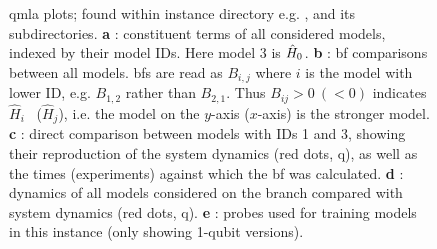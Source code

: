 \begin{figure}[H]
\begin{center}
{            \label{fig:qmla_bayes_factor_comparison}
        }
        \qquad
        \qquad
    \end{center}
    \caption[Instance plots]{
        \gls{qmla} plots; found within instance directory e.g. , 
        and its subdirectories. 
        \textbf{a} : constituent terms of all considered models, indexed by their model IDs.
        Here model 3 is $\hat{H}_0$. 
        \textbf{b} : \acrfull{bf} comparisons between all models. 
        \glspl{bf} are read as $B_{i,j}$ where $i$ is the model with lower ID, 
            e.g. $B_{1,2}$ rather than $B_{2,1}$. 
            Thus $B_{ij} > 0 \ (<0)$ indicates $\hat{H}_i$ \ ($\hat{H}_j$), i.e. the model on the $y$-axis ($x$-axis) 
            is the stronger model.
        \textbf{c} : direct comparison between models with IDs 1 and 3, 
            showing their reproduction of the system dynamics (red dots, \gls{q}), 
            as well as the times (\glspl{experiment}) against which the \gls{bf} was calculated. 
        \textbf{d} : dynamics of all models considered on the branch
        compared with system dynamics (red dots, \gls{q}). 
        \textbf{e} : probes used for training models in this \gls{instance} (only showing 1-qubit versions).
    }
    \label{fig:instance_plots}
\end{figure}

